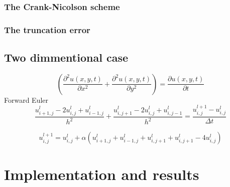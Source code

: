 \documentclass[10pt,a4paper]{article}
\begin{document}
\subsubsection{The Crank-Nicolson scheme}


\subsubsection{The truncation error}


\subsection{Two dimmentional case}
\begin{equation}
\left(\frac{\partial^2 u(x,y,t)}{\partial x^2} + \frac{\partial^2 u(x,y,t)}{\partial y^2}\right) = \frac{\partial u(x,y,t)}{\partial t}
\end{equation}
Forward Euler
\begin{equation}
\frac{u_{i+1,j}^l - 2u_{i,j}^l + u_{i-1,j}^l}{h^2} + \frac{u_{i,j+1}^l - 2u_{i,j}^l + u_{i,j-1}^l}{h^2} = \frac{u_{i,j}^{l+1} - u_{i,j}^l}{\Delta t}
\end{equation}

\begin{equation}
u_{i,j}^{l+1} = u_{i,j}^l + \alpha\left( u_{i+1,j}^l + u_{i-1,j}^l + u_{i,j+1}^l + u_{i,j+1}^l - 4u_{i,j}^l \right)
\end{equation}



\section{Implementation and results}\label{sec:implementation_and_results}




{}
\end{document}
